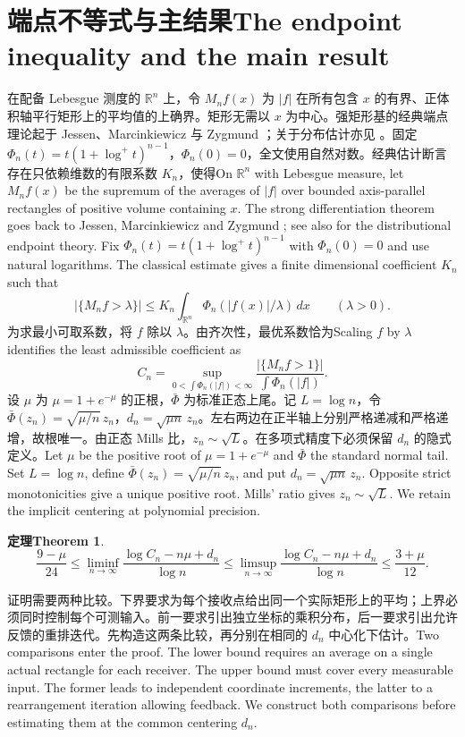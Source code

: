 \documentclass[UTF8,fontset=fandol,11pt]{ctexart}
\newcommand{\bi}[2]{\ifdefined\ResearchPaperChinese #1\else #2\fi}
\newtheorem{thm}{\bi{定理}{Theorem}}
\begin{document}
\section{\bi{端点不等式与主结果}{The endpoint inequality and the main result}}
\bi{在配备 Lebesgue 测度的 $\mathbb R^n$ 上，令 $M_n f(x)$ 为 $|f|$ 在所有包含 $x$ 的有界、正体积轴平行矩形上的平均值的上确界。矩形无需以 $x$ 为中心。强矩形基的经典端点理论起于 Jessen、Marcinkiewicz 与 Zygmund \cite{jmz}；关于分布估计亦见 \cite{lp}。固定 $\Phi_n(t)=t(1+\log^+t)^{n-1}$，$\Phi_n(0)=0$，全文使用自然对数。经典估计断言存在只依赖维数的有限系数 $K_n$，使得}{On $\mathbb R^n$ with Lebesgue measure, let $M_nf(x)$ be the supremum of the averages of $|f|$ over bounded axis-parallel rectangles of positive volume containing $x$. The strong differentiation theorem goes back to Jessen, Marcinkiewicz and Zygmund \cite{jmz}; see also \cite{lp} for the distributional endpoint theory. Fix $\Phi_n(t)=t(1+\log^+t)^{n-1}$ with $\Phi_n(0)=0$ and use natural logarithms. The classical estimate gives a finite dimensional coefficient $K_n$ such that}
\begin{equation}\label{class}
 |\{M_nf>\lambda\}|\le K_n\int_{\mathbb R^n}\Phi_n(|f(x)|/\lambda)\,dx
 \qquad(\lambda>0).
\end{equation}
\bi{为求最小可取系数，将 $f$ 除以 $\lambda$。由齐次性，最优系数恰为}{Scaling $f$ by $\lambda$ identifies the least admissible coefficient as}
\[
 C_n=\sup_{0<\int\Phi_n(|f|)<\infty}
 \frac{|\{M_nf>1\}|}{\int\Phi_n(|f|)} .
\]
\bi{设 $\mu$ 为 $\mu=1+e^{-\mu}$ 的正根，$\bar\Phi$ 为标准正态上尾。记 $L=\log n$，令 $\bar\Phi(z_n)=\sqrt{\mu/n}\,z_n$，$d_n=\sqrt{\mu n}\,z_n$。左右两边在正半轴上分别严格递减和严格递增，故根唯一。由正态 Mills 比，$z_n\sim\sqrt L$。在多项式精度下必须保留 $d_n$ 的隐式定义。}{Let $\mu$ be the positive root of $\mu=1+e^{-\mu}$ and $\bar\Phi$ the standard normal tail. Set $L=\log n$, define $\bar\Phi(z_n)=\sqrt{\mu/n}\,z_n$, and put $d_n=\sqrt{\mu n}\,z_n$. Opposite strict monotonicities give a unique positive root. Mills' ratio gives $z_n\sim\sqrt L$. We retain the implicit centering at polynomial precision.}
\begin{thm}\label{main}
\[
 \frac{9-\mu}{24}\le\liminf_{n\to\infty}
 \frac{\log C_n-n\mu+d_n}{\log n}
 \le\limsup_{n\to\infty}\frac{\log C_n-n\mu+d_n}{\log n}
 \le\frac{3+\mu}{12}.
\]
\end{thm}
\bi{证明需要两种比较。下界要求为每个接收点给出同一个实际矩形上的平均；上界必须同时控制每个可测输入。前一要求引出独立坐标的乘积分布，后一要求引出允许反馈的重排迭代。先构造这两条比较，再分别在相同的 $d_n$ 中心化下估计。}{Two comparisons enter the proof. The lower bound requires an average on a single actual rectangle for each receiver. The upper bound must cover every measurable input. The former leads to independent coordinate increments, the latter to a rearrangement iteration allowing feedback. We construct both comparisons before estimating them at the common centering $d_n$.}
\end{document}
